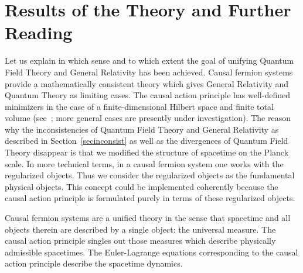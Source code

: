 \documentclass[reqno,11pt]{amsart}
\numberwithin{equation}{section}
\newcommand{\1}{\mbox{\rm 1 \hspace{-1.05 em} 1}}
\begin{document}
\section{Results of the Theory and Further Reading}
Let us explain in which sense and to which extent the goal of unifying Quantum Field Theory
and General Relativity has been achieved. Causal fermion systems provide a mathematically
consistent theory which gives General Relativity and Quantum Theory as limiting cases.
The causal action principle has well-defined minimizers in the
case of a finite-dimensional Hilbert space
and finite total volume (see~\cite{continuum}; more general cases are presently under investigation).
The reason why the inconsistencies
of Quantum Field Theory and General Relativity as described in Section~\ref{secinconsist}
as well as the divergences of Quantum Field Theory disappear is that we modified the structure
of spacetime on the Planck scale. In more technical terms, in a causal fermion system one works
with the regularized objects. Thus we consider the regularized objects as the fundamental physical
objects. This concept could be implemented coherently because the causal action principle is
formulated purely in terms of these regularized objects.

Causal fermion systems are a unified theory in the sense that spacetime and all objects therein are
described by a single object: the universal measure. The causal action principle singles out those
measures which describe physically admissible spacetimes. The Euler-Lagrange equations corresponding
to the causal action principle describe the spacetime dynamics.
\end{document}
